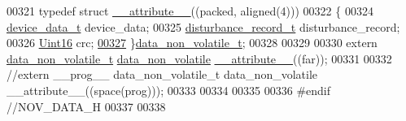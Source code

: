 \begin{DoxyCode}
00321 \textcolor{keyword}{typedef} \textcolor{keyword}{struct }\hyperlink{a00022_ad8187eb7fe09751a387e3dcb11c51565}{\_\_attribute\_\_}((packed, aligned(4)))
00322 \{
00324     \hyperlink{a00022_a95029dff9c90f6a6907353ba86eb3f33}{device\_data\_t}                          device\_data;
00325     \hyperlink{a00022_db/dbc/a00395}{disturbance\_record\_t}                   disturbance\_record;
00326     \hyperlink{a00072_a59a9f6be4562c327cbfb4f7e8e18f08b}{Uint16}                                 crc;
\hypertarget{a00022_source_l00327}{}\hyperlink{a00022_a8e66478e65e03ebc9434466e51c0ad0b}{00327} \}\hyperlink{a00022_a8e66478e65e03ebc9434466e51c0ad0b}{data\_non\_volatile\_t};
00328 
00329 
00330 \textcolor{keyword}{extern} \hyperlink{a00022_a8e66478e65e03ebc9434466e51c0ad0b}{data\_non\_volatile\_t}  \hyperlink{a00060_a76ac5f917f5308dcd83de0d7c94559fb}{data\_non\_volatile} 
      \hyperlink{a00022_ad8187eb7fe09751a387e3dcb11c51565}{\_\_attribute\_\_}((far));
00331 
00332 \textcolor{comment}{//extern \_\_prog\_\_ data\_non\_volatile\_t                 data\_non\_volatile  \_\_attribute\_\_((space(prog)));}
00333 
00334 
00335 
00336 \textcolor{preprocessor}{#endif //NOV\_DATA\_H}
00337 
00338 
\end{DoxyCode}
